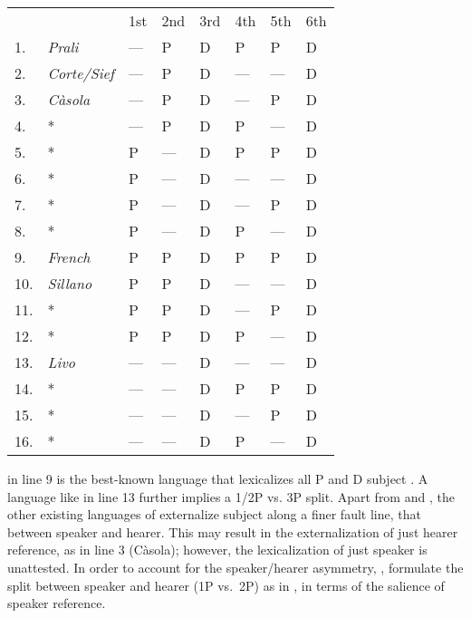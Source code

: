 \documentclass[output=paper]{langsci/langscibook}
\begin{document}
\ea\label{ex:06.19}
    \begin{tabular}[t]{llllllll}
         &                   & 1st & 2nd & 3rd & 4th & 5th & 6th \\
    1.   & \emph{Prali}      & --- & P   & D   & P   & P   & D \\
    2.   & \emph{Corte/Sief} & --- & P   & D   & --- & --- & D \\
    3.   & \emph{Càsola}     & --- & P   & D   & --- & P   & D \\
    4.   & *                 & --- & P   & D   & P   & --- & D \\
    5.   & *                 & P   & --- & D   & P   & P   & D \\
    6.   & *                 & P   & --- & D   & --- & --- & D \\
    7.   & *                 & P   & --- & D   & --- & P   & D \\
    8.   & *                 & P   & --- & D   & P   & --- & D \\
    9.   & \emph{French}     & P   & P   & D   & P   & P   & D \\
    10.  & \emph{Sillano}    & P   & P   & D   & --- & --- & D \\
    11.  & *                 & P   & P   & D   & --- & P   & D \\
    12.  & *                 & P   & P   & D   & P   & --- & D \\
    13.  & \emph{Livo}       & --- & --- & D   & --- & --- & D \\
    14.  & *                 & --- & --- & D   & P   & P   & D \\
    15.  & *                 & --- & --- & D   & --- & P   & D \\
    16.  & *                 & --- & --- & D   & P   & --- & D \\
    \end{tabular}
\z

 in line 9 is the best-known  language that lexicalizes all
P and D subject . A language like  in line 13 further implies a 1/2P
vs.  3P split. Apart from  and , the
other existing languages of  externalize subject 
along a finer fault line, that between speaker and hearer. This may result in
the externalization of just hearer reference, as in line 3 (Càsola); however,
the lexicalization of just speaker is unattested. In order to account for the
speaker/hearer asymmetry, \citet{ManSav2011}, \citet{Manzini2015b}
formulate the split between speaker and hearer (1P vs.\ 2P) as in
, in terms of the salience of speaker reference.
\end{document}
